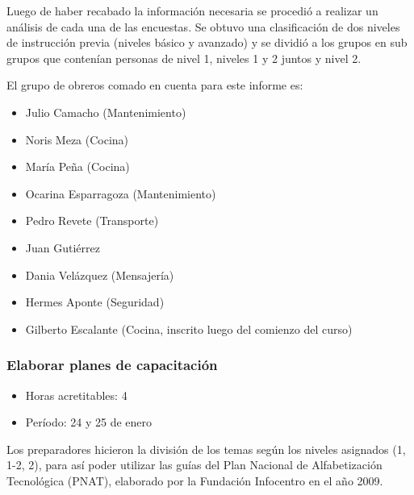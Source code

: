                 Luego de haber recabado la información necesaria se procedió a realizar un análisis de cada una de las encuestas. Se obtuvo una clasificación de dos niveles de instrucción previa (niveles básico y avanzado) y se dividió a los grupos en sub grupos que contenían personas de nivel 1, niveles 1 y 2 juntos y nivel 2.
                
                El grupo de obreros comado en cuenta para este informe es:
                \begin{itemize}
                    \item Julio Camacho (Mantenimiento)
                    \item Noris Meza (Cocina)
                    \item María Peña (Cocina)
                    \item Ocarina Esparragoza (Mantenimiento)
                    \item Pedro Revete (Transporte)
                    \item Juan Gutiérrez
                    \item Dania Velázquez (Mensajería)
                    \item Hermes Aponte (Seguridad)
                    \item Gilberto Escalante (Cocina, inscrito luego del comienzo del curso)
                \end{itemize}
                
             \subsubsection {Elaborar planes de capacitación}
             \begin{itemize}
                 \item Horas acretitables: 4
                 \item Período: 24 y 25 de enero
                \end{itemize}
                
                Los preparadores hicieron la división de los temas según los niveles asignados (1, 1-2, 2), para así poder utilizar las guías del Plan Nacional de Alfabetización Tecnológica (PNAT), elaborado por la Fundación Infocentro en el año 2009.
                
